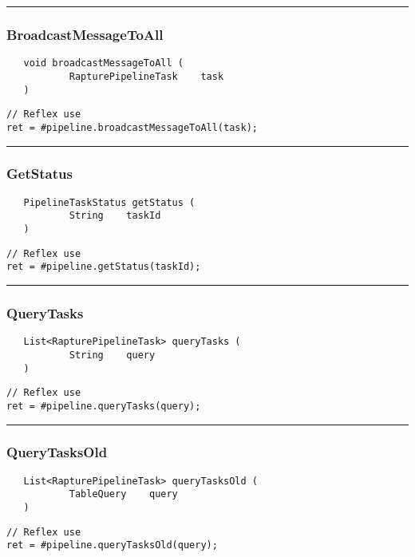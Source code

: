 \rule{15cm}{2pt}
\subsubsection{BroadcastMessageToAll}
\label{Api:BroadcastMessageToAll}
\begin{verbatim}
   void broadcastMessageToAll (
           RapturePipelineTask    task
   )
\end{verbatim}
\begin{lstlisting}[language=reflex]
// Reflex use
ret = #pipeline.broadcastMessageToAll(task);
\end{lstlisting}



\rule{15cm}{2pt}
\subsubsection{GetStatus}
\label{Api:GetStatus}
\begin{verbatim}
   PipelineTaskStatus getStatus (
           String    taskId
   )
\end{verbatim}
\begin{lstlisting}[language=reflex]
// Reflex use
ret = #pipeline.getStatus(taskId);
\end{lstlisting}



\rule{15cm}{2pt}
\subsubsection{QueryTasks}
\label{Api:QueryTasks}
\begin{verbatim}
   List<RapturePipelineTask> queryTasks (
           String    query
   )
\end{verbatim}
\begin{lstlisting}[language=reflex]
// Reflex use
ret = #pipeline.queryTasks(query);
\end{lstlisting}



\rule{15cm}{2pt}
\subsubsection{QueryTasksOld}
\label{Api:QueryTasksOld}
\begin{verbatim}
   List<RapturePipelineTask> queryTasksOld (
           TableQuery    query
   )
\end{verbatim}
\begin{lstlisting}[language=reflex]
// Reflex use
ret = #pipeline.queryTasksOld(query);
\end{lstlisting}



